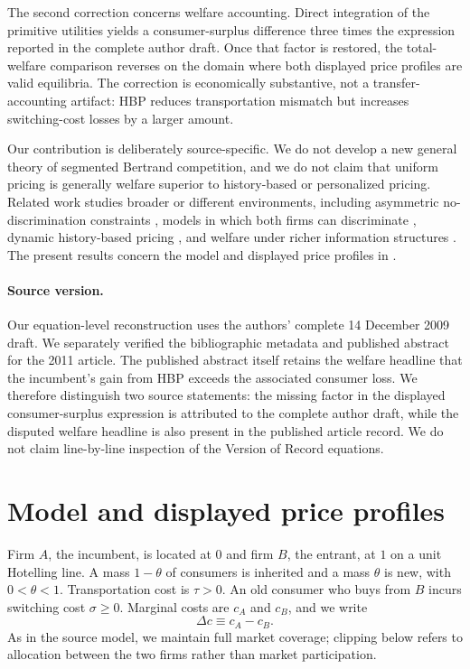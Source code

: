 \documentclass[11pt]{article}
\newcommand{\DC}{\Delta c}
\begin{document}
The second correction concerns welfare accounting. Direct integration of the
primitive utilities yields a consumer-surplus difference three times the
expression reported in the complete author draft. Once that factor is restored,
the total-welfare comparison reverses on the domain where both displayed price
profiles are valid equilibria. The correction is economically substantive, not
a transfer-accounting artifact: HBP reduces transportation mismatch but
increases switching-cost losses by a larger amount.

Our contribution is deliberately source-specific. We do not develop a new
general theory of segmented Bertrand competition, and we do not claim that
uniform pricing is generally welfare superior to history-based or personalized
pricing. Related work studies broader or different environments, including
asymmetric no-discrimination constraints \citep{bouckaert2013}, models in which
both firms can discriminate \citep{gehrig2012}, dynamic history-based pricing
\citep{shy2016}, and welfare under richer information structures
\citep{chen2026}. The present results concern the model and displayed price
profiles in \citet{gehrig2011}.

\paragraph{Source version.}
Our equation-level reconstruction uses the authors' complete 14 December 2009
draft. We separately verified the bibliographic metadata
and published abstract for the 2011 article. The published abstract itself
retains the welfare headline that the incumbent's gain from HBP exceeds the
associated consumer loss. We therefore distinguish two source statements:
the missing factor in the displayed consumer-surplus expression is attributed
to the complete author draft, while the disputed welfare headline is also
present in the published article record. We do not claim line-by-line
inspection of the Version of Record equations.

\section{Model and displayed price profiles}

Firm $A$, the incumbent, is located at $0$ and firm $B$, the entrant, at $1$ on
a unit Hotelling line. A mass $1-\theta$ of consumers is inherited and a mass
$\theta$ is new, with $0<\theta<1$. Transportation cost is $\tau>0$. An old
consumer who buys from $B$ incurs switching cost $\sigma\geq 0$. Marginal costs
are $c_A$ and $c_B$, and we write
\[
  \DC \equiv c_A-c_B.
\]
As in the source model, we maintain full market coverage; clipping below refers
to allocation between the two firms rather than market participation.
\end{document}
